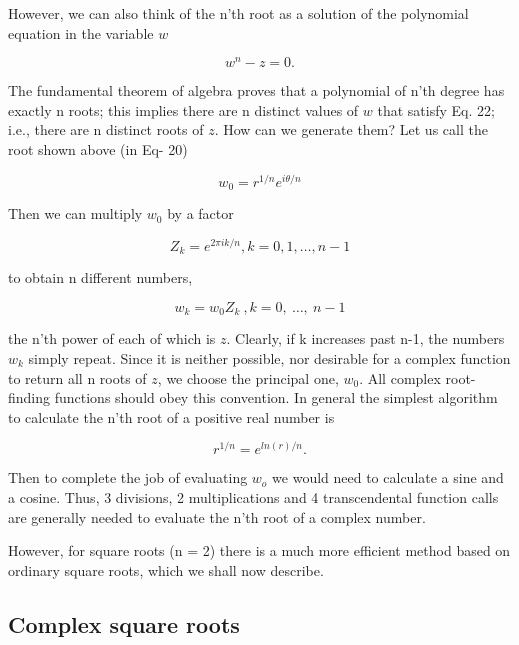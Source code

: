 However, we can also think of the n'th root as a solution of the polynomial equation in the variable $w$

\begin{equation}
  w^n - z = 0.
\end{equation}

The fundamental theorem of algebra proves that a polynomial of n'th degree has exactly n roots; this implies there are n distinct values of $w$ that satisfy Eq. 22; i.e., there are n distinct roots of $z$. How can we generate them? Let us call the root shown above (in Eq- 20)

\begin{equation*}
  w_0 = r^{1/n} e^{i\theta/n}
\end{equation*}

Then we can multiply $w_0$ by a factor

\begin{equation}
  Z_k = e^{2\pi ik/n}, k = 0, 1, \ldots, n-1
\end{equation}

to obtain n different numbers,

\begin{equation*}
  w_k = w_0Z_k\ , k=0,\ \ldots,\ n-1
\end{equation*}

the n'th power of each of which is $z$. Clearly, if k increases past n-1, the numbers $w_k$ simply repeat. Since it is neither possible, nor desirable for a complex function to return all n roots of $z$, we choose the principal one, $w_0$. All complex root-finding functions should obey this convention. In general the simplest algorithm to calculate the n’th root of a positive real number is

\begin{equation}
  r^{1/n} = e^{ln(r)/n}.
\end{equation}

Then to complete the job of evaluating $w_o$ we would need to calculate a sine and a cosine. Thus, 3 divisions, 2 multiplications and 4 transcendental function calls are generally needed to evaluate the n'th root of a complex number.

However, for square roots (n = 2) there is a much more efficient method based on ordinary square roots, which we shall now describe.

\subsection{Complex square roots}

